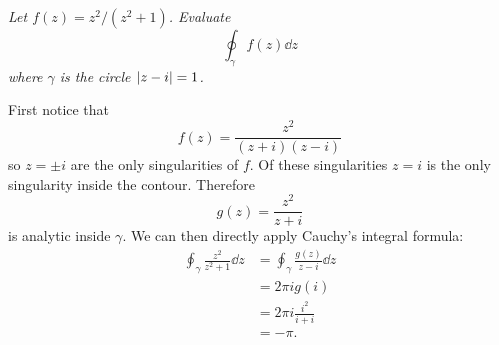 \documentclass{article}
\begin{document}
    \begin{example}
        \textit{Let \(f(z) = z^2/(z^2 + 1)\). Evaluate}
        \[\oint_\gamma f(z) \dd{z}\]
        \textit{where \(\gamma\) is the circle \(\abs{z - i} = 1\).}
        
        First notice that
        \[f(z) = \frac{z^2}{(z + i)(z - i)}\]
        so \(z = \pm i\) are the only singularities of \(f\).
        Of these singularities \(z = i\) is the only singularity inside the contour.
        Therefore
        \[g(z) = \frac{z^2}{z + i}\]
        is analytic inside \(\gamma\).
        We can then directly apply Cauchy's integral formula:
        \begin{align*}
            \oint_{\gamma} \frac{z^2}{z^2 + 1} \dd{z} &= \oint_{\gamma} \frac{g(z)}{z - i}\dd{z}\\
            &= 2\pi ig(i)\\
            &= 2\pi i\frac{i^2}{i + i}\\
            &= -\pi.
        \end{align*}
    \end{example}
\end{document}
